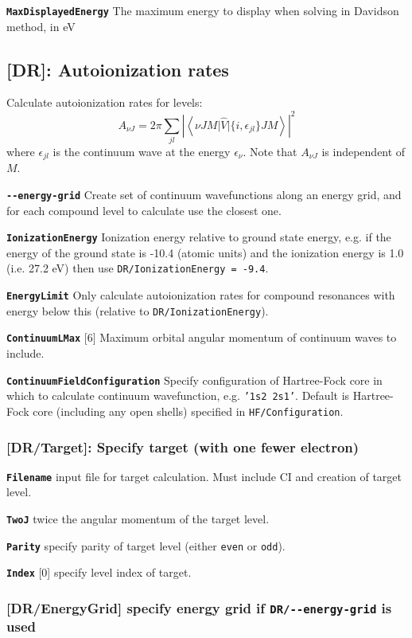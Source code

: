 \documentclass[a4paper,11pt]{article}
\newcommand{\option}[1]{\smallskip\noindent\textbf{\texttt{#1}}}
\newcommand{\code}[1]{\texttt{#1}}
\begin{document}
{\option{MaxDisplayedEnergy} The maximum energy to display when solving in Davidson method, in eV

\subsection{[DR]: Autoionization rates}

Calculate autoionization rates for levels:
\[
A_{\nu J} = 2\pi \sum_{j l} \left| \left< \nu JM \Big| \hat V \Big| \{i, \epsilon_{j l} \} JM \right> \right|^2
\]
where $\epsilon_{j l}$ is the continuum wave at the energy $\epsilon_\nu$. Note that $A_{\nu J}$ is independent of $M$.

\option{-{}-energy-grid} Create set of continuum wavefunctions along an energy grid, and for each compound level to calculate use the closest one.

\option{IonizationEnergy} Ionization energy relative to ground state energy, e.g. if the energy of the ground state is -10.4 (atomic units) and the ionization energy is  1.0 (i.e. 27.2 eV) then use \code{DR/IonizationEnergy = -9.4}.

\option{EnergyLimit} Only calculate autoionization rates for compound resonances with energy below this (relative to \code{DR/IonizationEnergy}).

\option{ContinuumLMax} [6] Maximum orbital angular momentum of continuum waves to include.

\option{ContinuumFieldConfiguration} Specify configuration of Hartree-Fock core in which to calculate continuum wavefunction, e.g. \code{'1s2 2s1'}. Default is Hartree-Fock core (including any open shells) specified in \code{HF/Configuration}.

\subsubsection{[DR/Target]: Specify target (with one fewer electron)}

\option{Filename} input file for target calculation. Must include CI and creation of target level.

\option{TwoJ} twice the angular momentum of the target level.

\option{Parity} specify parity of target level (either \code{even} or \code{odd}).

\option{Index} [0] specify level index of target.

\subsubsection{[DR/EnergyGrid] specify energy grid if \code{DR/-{}-energy-grid} is used}

}
\end{document}
